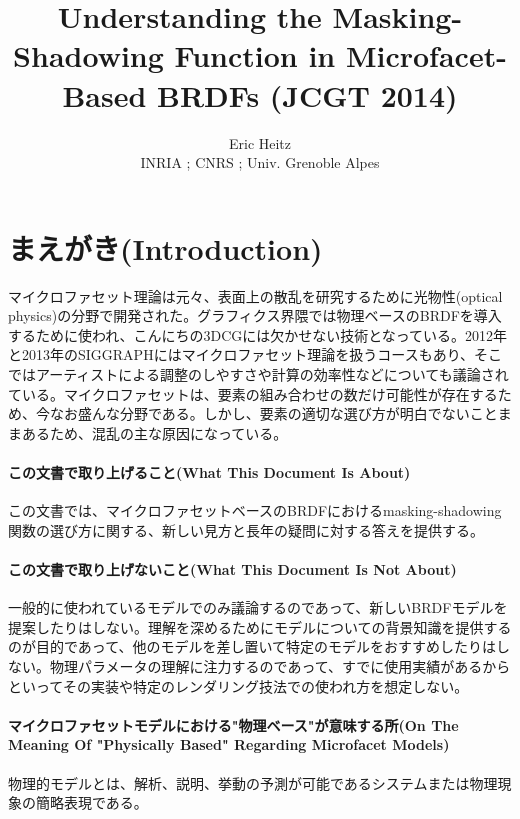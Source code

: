 \documentclass[a4j,xelatex,ja=standard]{bxjsarticle}
\title{Understanding the Masking-Shadowing Function in Microfacet-Based BRDFs (JCGT 2014)}
\author{Eric Heitz \\ INRIA ; CNRS ; Univ. Grenoble Alpes}
\begin{document}
\maketitle

\section{まえがき(Introduction)}

マイクロファセット理論は元々、表面上の散乱を研究するために光物性(optical physics)の分野で開発された。グラフィクス界隈では物理ベースのBRDFを導入するために使われ、こんにちの3DCGには欠かせない技術となっている。2012年と2013年のSIGGRAPHにはマイクロファセット理論を扱うコースもあり、そこではアーティストによる調整のしやすさや計算の効率性などについても議論されている。マイクロファセットは、要素の組み合わせの数だけ可能性が存在するため、今なお盛んな分野である。しかし、要素の適切な選び方が明白でないことままあるため、混乱の主な原因になっている。

\paragraph{この文書で取り上げること(What This Document Is About)}

この文書では、マイクロファセットベースのBRDFにおけるmasking-shadowing関数の選び方に関する、新しい見方と長年の疑問に対する答えを提供する。

\paragraph{この文書で取り上げないこと(What This Document Is Not About)}

一般的に使われているモデルでのみ議論するのであって、新しいBRDFモデルを提案したりはしない。理解を深めるためにモデルについての背景知識を提供するのが目的であって、他のモデルを差し置いて特定のモデルをおすすめしたりはしない。物理パラメータの理解に注力するのであって、すでに使用実績があるからといってその実装や特定のレンダリング技法での使われ方を想定しない。

\paragraph{マイクロファセットモデルにおける"物理ベース"が意味する所(On The Meaning Of "Physically Based" Regarding Microfacet Models)}

物理的モデルとは、解析、説明、挙動の予測が可能であるシステムまたは物理現象の簡略表現である。
\end{document}
